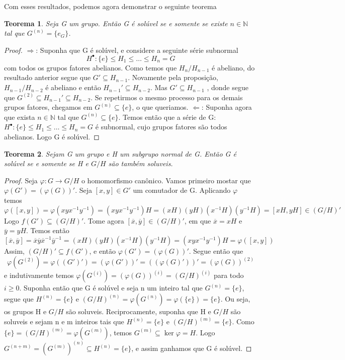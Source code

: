\documentclass[a4paper,12pt]{article}
\newtheorem*{theorem}{Teorema}
\theoremstyle{definition}
\theoremstyle{remark}
\begin{document}
Com esses resultados, podemos agora demonstrar o seguinte teorema

\begin{theorem}
    Seja G um grupo. Então G é solúvel se e somente se existe $n \in \mathbb{N}$ tal que $G^{(n)} = \{e_G\}$. 
\end{theorem}

\begin{proof}
    $\Rightarrow $: Suponha que G é solúvel, e considere a seguinte série subnormal
    \[H^{\bullet}: \{e\} \leq H_1 \leq \dots \leq H_n = G\]
    com todos os grupos fatores abelianos.
    Como temos que $H_n/H_{n-1}$ é abeliano, do resultado anterior segue que $G'\subseteq H_{n-1}$.
    Novamente pela proposição, $H_{n-1}/H_{n-2}$ é abeliano e então $H_{n-1}' \subseteq H_{n-2}$.
    Mas $G' \subseteq H_{n-1}$ , donde segue que $G^{(2)} \subseteq H_{n-1}' \subseteq H_{n-2}$.
    Se repetirmos o mesmo processo para os demais grupos fatores, chegamos em $G^{(n)} \subseteq \{e\}$, o que queriamos.
    $\Leftarrow $: Suponha agora que exista $n \in \mathbb{N}$ tal que $G^{(n)} \subseteq \{e\}$.
    Temos então que a série de G: $H^{\bullet}: \{e\} \leq H_1 \leq \dots \leq H_n = G$ é subnormal, cujo grupos fatores são todos abelianos.
    Logo G é solúvel.
\end{proof}

\begin{theorem}
    Sejam G um grupo e H um subgrupo normal de G. Então G é solúvel se e somente se H e $G/H$ são também soluveis.
\end{theorem}

\begin{proof}
    Seja $\varphi: G \rightarrow G/H$ o homomorfismo canônico. Vamos primeiro mostar que $\varphi(G') = (\varphi(G))'$.
    Seja $[x, y] \in G'$ um comutador de G. Aplicando $\varphi$ temos
    \[\varphi([x, y]) = \varphi(xyx^{-1}y^{-1}) = (xyx^{-1}y^{-1})H = (xH)(yH)(x^{-1}H)(y^{-1}H) = [xH, yH] \in (G/H)'\]
    Logo $f(G') \subseteq (G/H)'$.
    Tome agora $[\overline{x}, \overline{y}] \in (G/H)'$, em que $\overline{x} = xH$ e $\overline{y} = yH$.
    Temos então
    \[[\overline{x}, \overline{y}] = \overline{x}\overline{y}\overline{x}^{-1}\overline{y}^{-1} = (xH)(yH)(x^{-1}H)(y^{-1}H) = (xyx^{-1}y^{-1})H = \varphi([x, y])\]
    Assim, $(G/H)' \subseteq f(G')$, e então $\varphi(G') = (\varphi(G))'$.
    Segue então que 
    \[\varphi(G^{(2)}) = \varphi((G')')=(\varphi(G'))'=((\varphi(G)'))'=(\varphi(G))^{(2)}\]
    e indutivamente temos $\varphi(G^{(i)}) = (\varphi(G))^{(i)} = (G/H)^{(i)}$ para todo $i \geq 0$.
    Suponha então que G é solúvel e seja n um inteiro tal que $G^{(n)} = \{e\}$, segue que $H^{(n)} = \{e\}$
    e $(G/H)^{(n)}=\varphi(G^{(n)})=\varphi(\{e\})=\{e\}$. Ou seja, os grupos H e $G/H$ são soluveis. 
    Reciprocamente, suponha que H e $G/H$ são soluveis e sejam n e m inteiros tais que $H^{(n)}=\{e\}$ e $(G/H)^{(m)}=\{e\}$.
    Como $\{e\}=(G/H)^{(m)}=\varphi(G^{(m)})$, temos $G^{(m)} \subseteq \ker \varphi = H$.
    Logo $G^{(n+m)} = (G^{(m)})^{(n)} \subseteq H^{(n)} = \{e\}$, e assim ganhamos que G é solúvel.
\end{proof}
\end{document}
